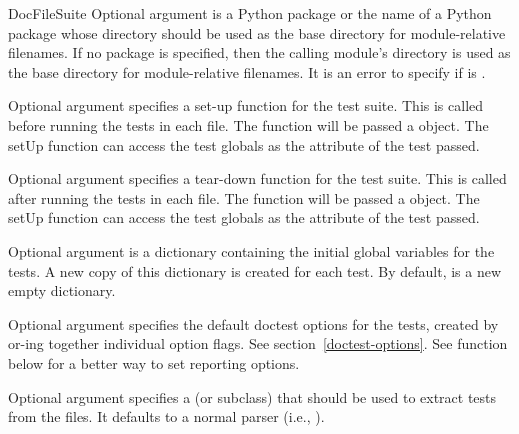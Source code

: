 \begin{funcdesc}{DocFileSuite}
  Optional argument  is a Python package or the name
  of a Python package whose directory should be used as the base
  directory for module-relative filenames.  If no package is
  specified, then the calling module's directory is used as the base
  directory for module-relative filenames.  It is an error to specify
   if  is .

  Optional argument  specifies a set-up function for
  the test suite.  This is called before running the tests in each
  file.  The  function will be passed a 
  object.  The setUp function can access the test globals as the
   attribute of the test passed.

  Optional argument  specifies a tear-down function
  for the test suite.  This is called after running the tests in each
  file.  The  function will be passed a 
  object.  The setUp function can access the test globals as the
   attribute of the test passed.

  Optional argument  is a dictionary containing the
  initial global variables for the tests.  A new copy of this
  dictionary is created for each test.  By default,  is
  a new empty dictionary.

  Optional argument  specifies the default
  doctest options for the tests, created by or-ing together
  individual option flags.  See section~\ref{doctest-options}.
  See function  below for
  a better way to set reporting options.

  Optional argument  specifies a  (or
  subclass) that should be used to extract tests from the files.  It
  defaults to a normal parser (i.e., ).

\end{funcdesc}

